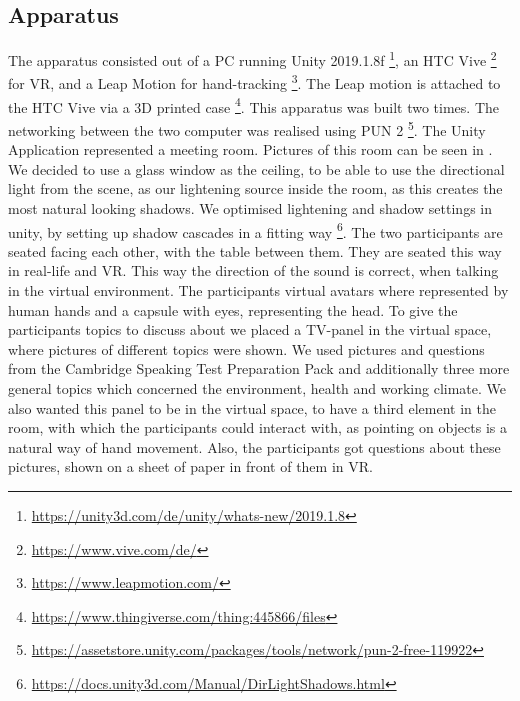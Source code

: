 \documentclass[english,runningheads,a4paper]{llncs}[2018/03/10]
\begin{document}
\subsection{Apparatus}
The apparatus consisted out of a PC running Unity 2019.1.8f \footnote{\url{https://unity3d.com/de/unity/whats-new/2019.1.8}}, an HTC Vive \footnote{\url{https://www.vive.com/de/}} for VR, and a Leap Motion for hand-tracking \footnote{\url{https://www.leapmotion.com/}}.
The Leap motion is attached to the HTC Vive via a 3D printed case  \footnote{\url{https://www.thingiverse.com/thing:445866/files}}.
This apparatus was built two times.
The networking between the two computer was realised using PUN 2 \footnote{\url{https://assetstore.unity.com/packages/tools/network/pun-2-free-119922}}.
The Unity Application represented a meeting room. 
Pictures of this room can be seen in .
We decided to use a glass window as the ceiling, to be able to use the directional light from the scene, as our lightening source inside the room, as this creates the most natural looking shadows. 
We optimised lightening and shadow settings in unity, by setting up shadow cascades in a fitting way \footnote{\url{https://docs.unity3d.com/Manual/DirLightShadows.html}}.
The two participants are seated facing each other, with the table between them. 
They are seated this way in real-life and VR. 
This way the direction of the sound is correct, when talking in the virtual environment.
The participants virtual avatars where represented by human hands and a capsule with eyes, representing the head.
To give the participants topics to discuss about we placed a TV-panel in the virtual space, where pictures of different topics were shown.
We used pictures and questions from the Cambridge Speaking Test Preparation Pack \cite{cambridge} and additionally three more general topics which concerned the environment, health and working climate. 
We also wanted this panel to be in the virtual space, to have a third element in the room, with which the participants could interact with, as pointing on objects is a natural way of hand movement. 
Also, the participants got questions about these pictures, shown on a sheet of paper in front of them in VR. 
\end{document}
